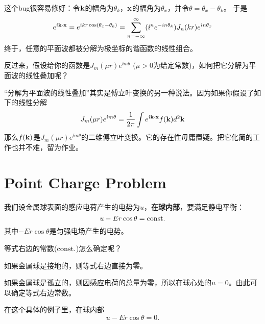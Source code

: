 \documentclass[CJK]{beamer}
\begin{document}
\begin{frame}
  \bch
  这个bug很容易修好：令${\mathbf{k}}$的幅角为$\theta_k$，${\mathbf{x}}$的幅角为$\theta_x$，并令$\theta=\theta_x-\theta_k$。
  于是
  $$ e^{{\dot{\imath}} {\mathbf{k}}\cdot{\mathbf{x}}} = e^{{\dot{\imath}} k r\cos(\theta_x-\theta_k)} = \sum_{n=-\infty}^\infty ({\dot{\imath}}^ne^{-{\dot{\imath}} n\theta_k}) J_n(kr)e^{{\dot{\imath}} n\theta_x}$$
  终于，任意的平面波都被分解为极坐标的谐函数的线性组合。

  
  \ech
\end{frame}



\begin{frame}
  \bch
  反过来，假设给你的函数是$J_m(\mu r)e^{\ii m\theta}$ ($\mu >0$为给定常数)，如何把它分解为平面波的线性叠加呢？

  \skiplines
  
  ``分解为平面波的线性叠加''其实是傅立叶变换的另一种说法。因为如果你假设了如下的线性分解
  $$J_m(\mu r)e^{{\dot{\imath}} m\theta} = \frac{1}{2\pi} \int e^{{\dot{\imath}} {\mathbf{k}} \cdot{\mathbf{x}}}f({\mathbf{k}}) d^2{\mathbf{k}} $$
  那么$f({\mathbf{k}})$是$J_m(\mu r)e^{\ii m\theta}$的二维傅立叶变换。它的存在性毋庸置疑。把它化简的工作也并不难，留为作业。

  \ech
\end{frame}




\section{Point Charge Problem}

\begin{frame}
  \bch
  我们设金属球表面的感应电荷产生的电势为$u$，{\bf 在球内部}，要满足静电平衡：
  $$ u - Er\cos\theta =  \mathrm{const.} $$
  其中$-Er\cos\theta$是匀强电场产生的电势。

  \skiplines
  
  等式右边的常数($\mathrm{const.}$)怎么确定呢？
  

  \bitem
\item{如果金属球是接地的，则等式右边直接为零。}    
\item{如果金属球是孤立的，则因感应电荷的总量为零，所以在球心处的$u=0$。由此可以确定等式右边常数。}
  \eitem

  在这个具体的例子里，在球内部
  $$ u - Er\cos\theta =  0. $$  
  
  \ech
\end{frame}
\end{document}
